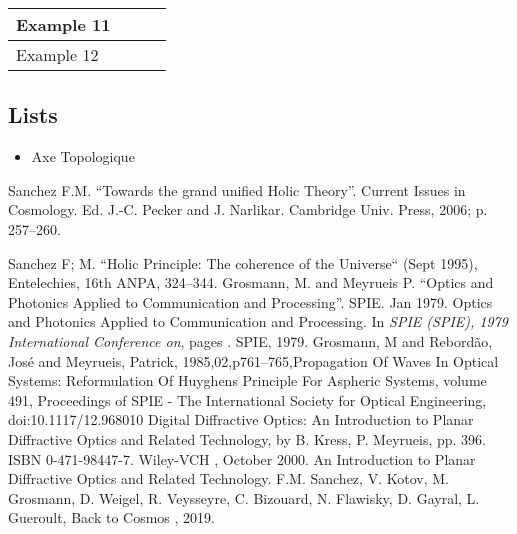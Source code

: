 \documentclass{article}
\begin{document}
\begin{table}[]
\begin{tabular}{|l|l|l|l|}
Example 11  &                                                                                                                                                  &                                                                                                                                       &                                                                                               \\ \hline
Example 12  &                                                                                                                                                  &                                                                                                                                       &                                                                                               \\ \hline
\end{tabular}
\end{table}

\subsection{Lists}

\begin{itemize}
\item Axe Topologique
\end{itemize}


  


\begin{thebibliography}{1}

 Sanchez F.M. ``Towards the grand unified Holic Theory''. Current
Issues in Cosmology. Ed. J.-C. Pecker and J. Narlikar. Cambridge Univ. Press,
2006; p. 257--260.

 Sanchez F; M. ``Holic Principle: The coherence of the Universe`` (Sept 1995), Entelechies, 16th ANPA, 324--344.
 Grosmann, M. and Meyrueis P. ``Optics and Photonics Applied to Communication and Processing''. SPIE.  Jan 1979.
\newblock Optics and Photonics Applied to Communication and Processing.
\newblock In {\em SPIE (SPIE), 1979 
  International Conference on}, pages . SPIE, 1979.
 Grosmann, M and Rebordão, José and Meyrueis, Patrick, 1985,02,p761--765,Propagation Of Waves In Optical Systems: Reformulation Of Huyghens Principle For Aspheric Systems,
volume 491, Proceedings of SPIE - The International Society for Optical Engineering, doi:10.1117/12.968010
 Digital Diffractive Optics: An Introduction to Planar Diffractive Optics and Related Technology, by B. Kress, P. Meyrueis, pp. 396. ISBN 0-471-98447-7. Wiley-VCH , October 2000.
\newblock An Introduction to Planar Diffractive Optics and Related Technology.
 F.M. Sanchez, V. Kotov, M. Grosmann, D. Weigel, R. Veysseyre, C. Bizouard, N. Flawisky, D. Gayral, L. Gueroult, Back to Cosmos
, 2019.
\end{thebibliography}
\end{document}
